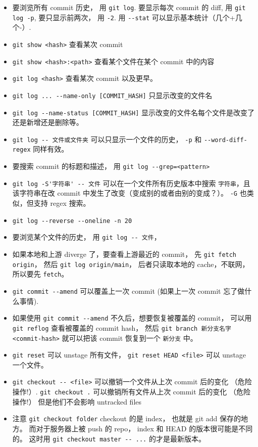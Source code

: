 \begin{itemize}
\item 要浏览所有 commit 历史， 用 \verb`git log`. 要显示每次 commit 的 diff, 用 \verb`git log -p`, 要只显示前两次， 用 \verb`-2`. 用 \verb`--stat` 可以显示基本统计（几个+几个-）.
\item \verb`git show <hash>` 查看某次 commit
\item \verb`git show <hash>:<path>` 查看某个文件在某个 commit 中的内容
\item \verb`git log <hash>` 查看某次 commit 以及更早。
\item \verb`git log ... --name-only [COMMIT_HASH]` 只显示改变的文件名
\item \verb`git log --name-status [COMMIT_HASH]` 显示改变的文件名每个文件是改变了还是新增还是删除等。
\item \verb`git log -- 文件或文件夹` 可以只显示一个文件的历史， \verb`-p` 和 \verb`--word-diff-regex` 同样有效。
\item 要搜索 commit 的标题和描述， 用 \verb`git log --grep=<pattern>`
\item \verb`git log -S'字符串' -- 文件` 可以在一个文件所有历史版本中搜索 \verb`字符串`，且该字符串在改 commit 中发生了改变（变成别的或者由别的变成？）。 \verb`-G` 也类似，但支持 regex 搜索。
\item \verb`git log --reverse --oneline -n 20`
\item 要浏览某个文件的历史， 用 \verb`git log -- 文件`， 
\item 如果本地和上游 diverge 了，要查看上游最近的 commit， 先 \verb`git fetch origin`， 然后 \verb`git log origin/main`， 后者只读取本地的 cache，不联网，所以要先 \verb`fetch`。
\item \verb`git commit --amend` 可以覆盖上一次 commit (如果上一次 commit 忘了做什么事情).
\item 如果使用 \verb`git commit --amend` 不久后，想要恢复被覆盖的 commit， 可以用 \verb`git reflog` 查看被覆盖的 commit hash， 然后 \verb`git branch 新分支名字 <commit-hash>` 就可以把该 commit 恢复到一个 \verb`新分支` 中。
\item \verb`git reset` 可以 unstage 所有文件， \verb`git reset HEAD <file>` 可以 unstage 一个文件。
\item \verb`git checkout -- <file>` 可以撤销一个文件从上次 commit 后的变化 （危险操作!）. \verb`git checkout .` 可以撤销所有文件从上次 commit 后的变化 （危险操作!） 但是他们不会影响 untracked files
\item 注意 \verb`git checkout folder` checkout 的是 index， 也就是 git add 保存的地方。 而对于服务器上被 push 的 repo， index 和 HEAD 的版本很可能是不同的。 这时用 \verb`git checkout master -- ...` 的才是最新版本。

\end{itemize}
